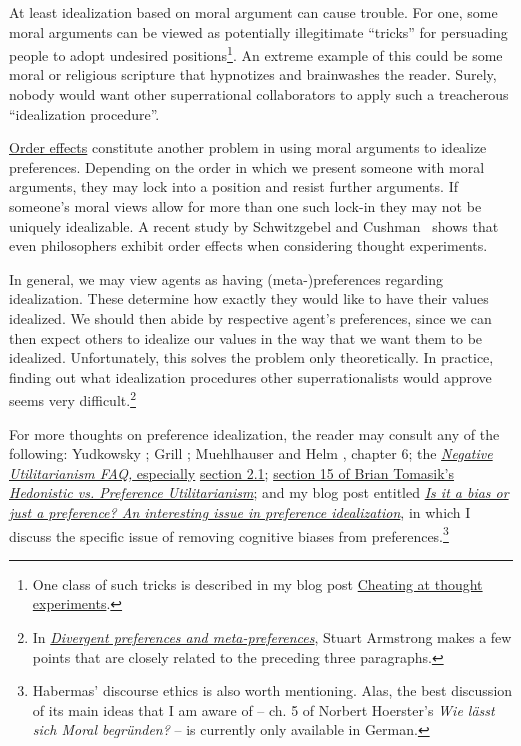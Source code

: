 At least idealization based on moral argument can cause trouble. For
one, some moral arguments can be viewed as potentially illegitimate
``tricks'' for persuading people to adopt undesired positions\footnote{One
  class of such tricks is described in my blog post
  \href{https://casparoesterheld.com/2015/12/06/cheating-at-thought-experiments/}{Cheating
  at thought experiments}.}. An extreme example of this could be some
moral or religious scripture that hypnotizes and brainwashes the reader.
Surely, nobody would want other superrational collaborators to apply
such a treacherous ``idealization procedure''.

\href{http://www.philosophyexperiments.com/sedan/Default5.aspx}{Order
effects} constitute another problem in using moral arguments to
idealize preferences. Depending on the order in which we present someone
with moral arguments, they may lock into a position and resist further
arguments. If someone's moral views allow for more than one such lock-in
they may not be uniquely idealizable. A recent study by
Schwitzgebel and Cushman~\citeyear{Schwitzgebel2012-vh} shows that even philosophers
exhibit order effects when considering thought experiments.

In general, we may view agents as having (meta-)preferences regarding
idealization. These determine how exactly they would like to have their
values idealized. We should then abide by respective agent's
preferences, since we can then expect others to idealize our values in
the way that we want them to be idealized. Unfortunately, this solves
the problem only theoretically. In practice, finding out what
idealization procedures other superrationalists would approve seems very
difficult.\footnote{In
  \href{https://agentfoundations.org/item?id=1492}{\emph{Divergent
  preferences and meta-preferences}}, Stuart Armstrong makes a few
  points that are closely related to the preceding three paragraphs.}

For more thoughts on preference idealization, the reader may consult any
of the following:
Yudkowsky \citeyear{Yudkowsky2004-fz}; Grill
\citeyear{Grill2015-wk}; Muehlhauser and Helm \citeyear{Muehlhauser2012-ib}, chapter 6;
the
\href{https://www.utilitarianism.com/nu/nufaq.html}{\emph{Negative
Utilitarianism FAQ,} especially}
\href{https://www.utilitarianism.com/nu/nufaq.html\#2.1}{section
2.1}; \href{https://foundational-research.org/hedonistic-vs-preference-utilitarianism/#Idealized_preferences_and_agent-moments}{section 15 of Brian Tomasik's \emph{Hedonistic vs. Preference Utilitarianism}}; and my blog post entitled
\href{https://casparoesterheld.com/2017/01/18/is-it-a-bias-or-just-a-preference-an-interesting-issue-in-preference-idealization/}{\emph{Is
it a bias or just a preference? An interesting issue in preference
idealization}}, in which I discuss the specific issue of removing
cognitive biases from preferences.\footnote{Habermas' discourse ethics
  is also worth mentioning. Alas, the best discussion of its main ideas
  that I am aware of -- ch. 5 of Norbert Hoerster's \emph{Wie lässt sich
  Moral begründen?} -- is currently only available in German.}

